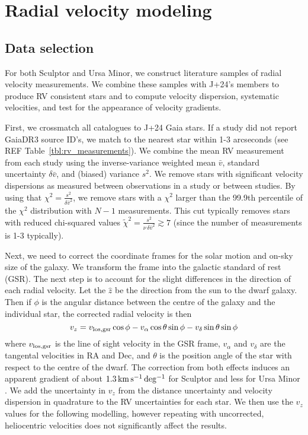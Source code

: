 \chapter{Radial velocity modeling}\label{sec:rv_obs}

\section{Data selection}\label{data-selection}

For both Sculptor and Ursa Minor, we construct literature samples of
radial velocity measurements. We combine these samples with J+24's
members to produce RV consistent stars and to compute velocity
dispersion, systematic velocities, and test for the appearance of
velocity gradients.

First, we crossmatch all catalogues to J+24 Gaia stars. If a study did
not report GaiaDR3 source ID's, we match to the nearest star within 1-3
arcseconds (see REF Table~\ref{tbl:rv_measurements}). We combine the
mean RV measurement from each study using the inverse-variance weighted
mean \(\bar v\), standard uncertainty \(\delta \bar v\), and (biased)
variance \(s^2\). We remove stars with significant velocity dispersions
as measured between observations in a study or between studies. By using
that \(\chi^2=\frac{s^2}{\delta \bar v^2}\), we remove stars with a
\(\chi^2\) larger than the 99.9th percentile of the \(\chi^2\)
distribution with \(N-1\) measurements. This cut typically removes stars
with reduced chi-squared values
\(\tilde\chi^2  = \frac{s^2}{\nu\,\delta \bar v^2}\gtrsim 7\) (since the
number of measurements is 1-3 typically).

Next, we need to correct the coordinate frames for the solar motion and
on-sky size of the galaxy. We transform the frame into the galactic
standard of rest (GSR). The next step is to account for the slight
differences in the direction of each radial velocity. Let the \(\hat z\)
be the direction from the sun to the dwarf galaxy. Then if \(\phi\) is
the angular distance between the centre of the galaxy and the individual
star, the corrected radial velocity is then \begin{equation}{
v_z = v_{\rm los, gsr}\cos\phi  - v_{\alpha}\cos\theta \sin\phi - v_\delta \sin\theta\sin\phi
}\end{equation} where \(v_{\rm los, gsr}\) is the line of sight velocity
in the GSR frame, \(v_\alpha\) and \(v_\delta\) are the tangental
velocities in RA and Dec, and \(\theta\) is the position angle of the
star with respect to the centre of the dwarf. The correction from both
effects induces an apparent gradient of about \(1.3\,{\rm km\,s^{-1}\,deg^{-1}}\) for
Sculptor and less for Ursa Minor \citep[see
also][]{WMO2008, strigari2010}. We add the uncertainty in \(v_z\) from
the distance uncertainty and velocity dispersion in quadrature to the RV
uncertainties for each star. We then use the \(v_z\) values for the
following modelling, however repeating with uncorrected, heliocentric
velocities does not significantly affect the results.

